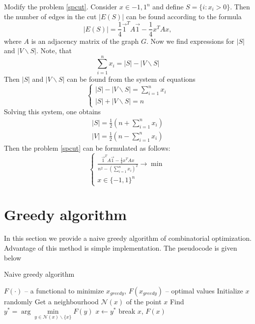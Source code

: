 \documentclass[12pt]{article}
\begin{document}
Modify the problem \ref{spcut}.
Consider $x \in {-1, 1}^n$ and define $S = \{ i : x_i > 0 \}$.
Then the number of edges in the cut $|E(S)|$ can be found according to the formula 
\[
	| E(S) | = \frac14 \vec 1^T A \vec 1 - \frac14 x^T A x,
\]
where $A$ is an adjacency matrix of the graph $G$.
Now we find expressions for $|S|$ and $|V\backslash S|$.
Note, that
\[
	\sum\limits_{i=1}^n x_i = |S| - |V\backslash S|
\]
Then $|S|$ and $|V\backslash S|$ can be found from the system of equations
\[
	\begin{cases}
		|S| - |V\backslash S| = \sum\limits_{i=1}^n x_i\\
		|S| + |V\backslash S| = n
	\end{cases}
\]
Solving this system, one obtains
\begin{gather}
\label{1}
	|S| = \frac12 \left( n + \sum\limits_{i=1}^n x_i \right) \\
	|V| = \frac12 \left( n - \sum\limits_{i=1}^n x_i \right)
\end{gather}
Then the problem \ref{spcut} can be formulated as follows:
\begin{equation}
\label{spcut1}
	\begin{cases}
		\frac{ \vec 1^T A \vec 1 - \frac14 x^T A x }{ n^2 - \left( \sum\limits_{i=1}^n x_i 
		\right)^2 } 
		\longrightarrow \min \\
		x \in \{-1, 1\}^n
	\end{cases}
\end{equation} 

	
		
\section{Greedy algorithm}

In this section we provide a naive greedy algorithm of combinatorial optimization.
Advantage of this method is simple implementation.
The pseudocode is given below

\begin{algorithm}[H]
	\caption{Naive greedy algorithm}
	\label{greedy}
	\begin{algorithmic}[1]
		\Require $F(\cdot)$ -- a functional to minimize
		\Ensure $x_{greedy}$, $F(x_{greedy})$ -- optimal values
		\State Initialize $x$ randomly
			\State Get a neighbourhood $\mathcal N(x)$ of the point $x$
			\State Find $y^* = \arg\min\limits_{y \in \mathcal N(x) \backslash \{x\}} F(y)$ 
				\State $x \gets y^*$
			\Else
				\State break
			\EndIf
		\EndWhile
		 $x$, $F(x)$
	\end{algorithmic}
\end{algorithm}
\end{document}
